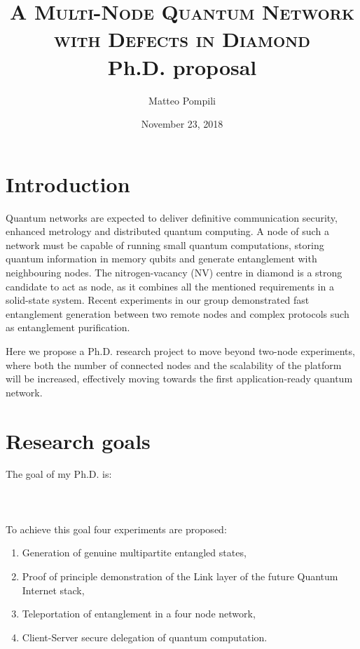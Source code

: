 \documentclass[a4paper]{article}
\title{
	\huge{\textsc{A Multi-Node Quantum Network\\with Defects in Diamond}}\\
	\vspace{10pt}\Large{Ph.D. proposal}
}
\author{Matteo Pompili}
\date{November 23, 2018}
\begin{document}
\maketitle

\section*{Introduction}

Quantum networks are expected to deliver definitive communication security, enhanced metrology and distributed quantum computing. 
A node of such a network must be capable of running small quantum computations, storing quantum information in memory qubits and generate entanglement with neighbouring nodes.
The nitrogen-vacancy (NV) centre in diamond is a strong candidate to act as node, as it combines all the mentioned requirements in a solid-state system. Recent experiments in our group demonstrated fast entanglement generation between two remote nodes and complex protocols such as entanglement purification.

Here we propose a Ph.D. research project to move beyond two-node experiments, where both the number of connected nodes and the scalability of the platform will be increased, effectively moving towards the first  application-ready quantum network.

\setcounter{secnumdepth}{1}
\setcounter{tocdepth}{1}
\tableofcontents

\newpage
\section{Research goals}
The goal of my Ph.D. is:\\\\
\\\\

To achieve this goal four experiments are proposed: 
\begin{enumerate}
	\item Generation of genuine multipartite entangled states,
	\item Proof of principle demonstration of the Link layer of the future Quantum Internet stack,
	\item Teleportation of entanglement in a four node network,
	\item Client-Server secure delegation of quantum computation.
\end{enumerate}
\end{document}
